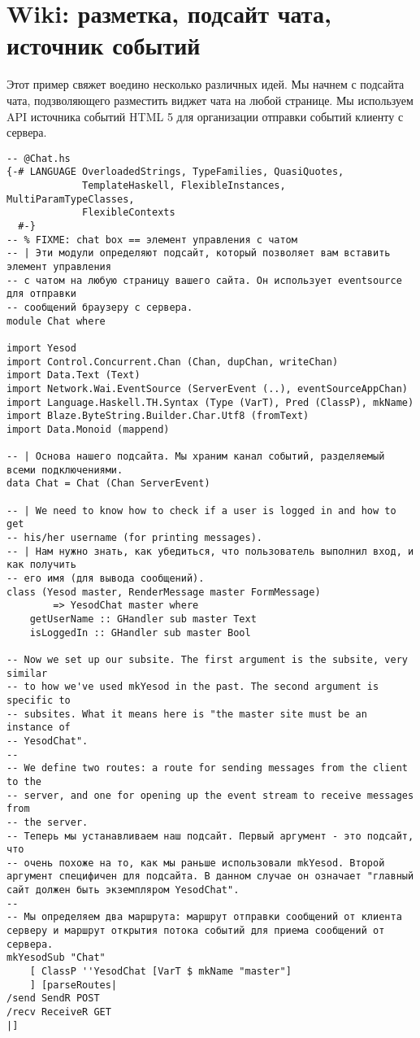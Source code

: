 
\chapter{Wiki: разметка, подсайт чата, источник событий}
\label{}

Этот пример свяжет воедино несколько различных идей. Мы начнем с подсайта чата, подзволяющего разместить виджет чата на любой странице. Мы используем API источника событий HTML 5 для организации отправки событий клиенту с сервера.

\begin{lstlisting}
-- @Chat.hs
{-# LANGUAGE OverloadedStrings, TypeFamilies, QuasiQuotes,
             TemplateHaskell, FlexibleInstances, MultiParamTypeClasses,
             FlexibleContexts
  #-}
-- % FIXME: chat box == элемент управления с чатом
-- | Эти модули определяют подсайт, который позволяет вам вставить элемент управления
-- с чатом на любую страницу вашего сайта. Он использует eventsource для отправки
-- сообщений браузеру с сервера.
module Chat where

import Yesod
import Control.Concurrent.Chan (Chan, dupChan, writeChan)
import Data.Text (Text)
import Network.Wai.EventSource (ServerEvent (..), eventSourceAppChan)
import Language.Haskell.TH.Syntax (Type (VarT), Pred (ClassP), mkName)
import Blaze.ByteString.Builder.Char.Utf8 (fromText)
import Data.Monoid (mappend)

-- | Основа нашего подсайта. Мы храним канал событий, разделяемый всеми подключениями.
data Chat = Chat (Chan ServerEvent)

-- | We need to know how to check if a user is logged in and how to get
-- his/her username (for printing messages).
-- | Нам нужно знать, как убедиться, что пользователь выполнил вход, и как получить
-- его имя (для вывода сообщений).
class (Yesod master, RenderMessage master FormMessage)
        => YesodChat master where
    getUserName :: GHandler sub master Text
    isLoggedIn :: GHandler sub master Bool

-- Now we set up our subsite. The first argument is the subsite, very similar
-- to how we've used mkYesod in the past. The second argument is specific to
-- subsites. What it means here is "the master site must be an instance of
-- YesodChat".
--
-- We define two routes: a route for sending messages from the client to the
-- server, and one for opening up the event stream to receive messages from
-- the server.
-- Теперь мы устанавливаем наш подсайт. Первый аргумент - это подсайт, что
-- очень похоже на то, как мы раньше использовали mkYesod. Второй аргумент специфичен для подсайта. В данном случае он означает "главный сайт должен быть экземпляром YesodChat".
--
-- Мы определяем два маршрута: маршрут отправки сообщений от клиента серверу и маршрут открытия потока событий для приема сообщений от сервера.
mkYesodSub "Chat"
    [ ClassP ''YesodChat [VarT $ mkName "master"]
    ] [parseRoutes|
/send SendR POST
/recv ReceiveR GET
|]


\end{lstlisting}
